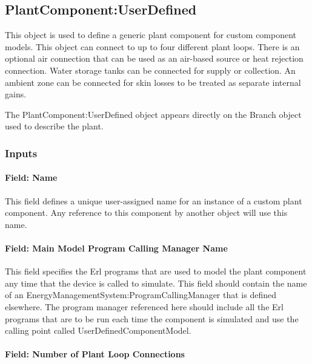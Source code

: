 \subsection{PlantComponent:UserDefined}\label{plantcomponentuserdefined}

This object is used to define a generic plant component for custom component models. This object can connect to up to four different plant loops.
There is an optional air connection that can be used as an air-based source or heat rejection connection.
Water storage tanks can be connected for supply or collection. An ambient zone can be connected for skin losses to be treated as separate internal gains.

The PlantComponent:UserDefined object appears directly on the Branch object used to describe the plant.

\subsubsection{Inputs}\label{plantcomponentuserdefined-inputs}

\paragraph{Field: Name}\label{field-name-3-035}

This field defines a unique user-assigned name for an instance of a custom plant component. Any reference to this component by another object will use this name.

\paragraph{Field: Main Model Program Calling Manager Name}\label{field-main-model-program-calling-manager-name}

This field specifies the Erl programs that are used to model the plant component any time that the device is called to simulate. This field should contain the name of an EnergyManagementSystem:ProgramCallingManager that is defined elsewhere. The program manager referenced here should include all the Erl programs that are to be run each time the component is simulated and use the calling point called UserDefinedComponentModel.

\paragraph{Field: Number of Plant Loop Connections}\label{field-number-of-plant-loop-connections-2}

